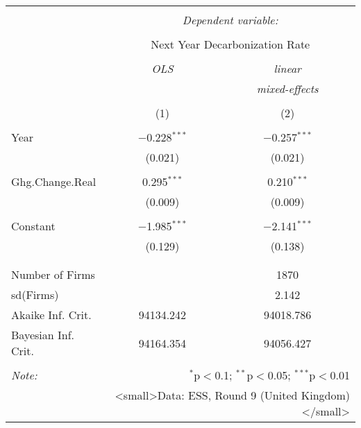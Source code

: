 
\begin{table}[!htbp] \centering 
  \caption{} 
  \label{} 
\begin{tabular}{@{\extracolsep{5pt}}lcc} 
\\[-1.8ex]\hline 
\hline \\[-1.8ex] 
 & \multicolumn{2}{c}{\textit{Dependent variable:}} \\ 
\cline{2-3} 
\\[-1.8ex] & \multicolumn{2}{c}{Next Year Decarbonization Rate} \\ 
\\[-1.8ex] & \textit{OLS} & \textit{linear} \\ 
 & \textit{} & \textit{mixed-effects} \\ 
\\[-1.8ex] & (1) & (2)\\ 
\hline \\[-1.8ex] 
 Year & $-$0.228$^{***}$ & $-$0.257$^{***}$ \\ 
  & (0.021) & (0.021) \\ 
  & & \\ 
 Ghg.Change.Real & 0.295$^{***}$ & 0.210$^{***}$ \\ 
  & (0.009) & (0.009) \\ 
  & & \\ 
 Constant & $-$1.985$^{***}$ & $-$2.141$^{***}$ \\ 
  & (0.129) & (0.138) \\ 
  & & \\ 
\hline \\[-1.8ex] 
Number of Firms &  & 1870 \\ 
sd(Firms) &  & 2.142 \\ 
Akaike Inf. Crit. & 94134.242 & 94018.786 \\ 
Bayesian Inf. Crit. & 94164.354 & 94056.427 \\ 
\hline 
\hline \\[-1.8ex] 
\textit{Note:}  & \multicolumn{2}{r}{$^{*}$p$<$0.1; $^{**}$p$<$0.05; $^{***}$p$<$0.01} \\ 
 & \multicolumn{2}{r}{<small>Data: ESS, Round 9 (United Kingdom)</small>} \\ 
\end{tabular} 
\end{table} 
